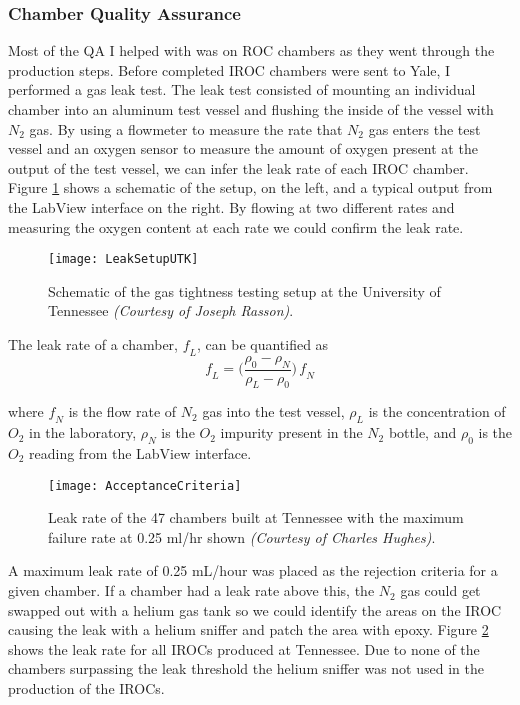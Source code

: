 \subsubsection{Chamber Quality Assurance}

Most of the QA I helped with was on ROC chambers as they went through the production steps.  Before completed IROC chambers were sent to Yale, I performed a gas leak test.  The leak test consisted of mounting an individual chamber into an aluminum test vessel and flushing the inside of the vessel with $N_{2}$ gas.  By using a flowmeter to measure the rate that $N_{2}$ gas enters the test vessel and an oxygen sensor to measure the amount of oxygen present at the output of the test vessel, we can infer the leak rate of each IROC chamber.  Figure \ref{fig:LeakTest} shows a schematic of the setup, on the left, and a typical output from the LabView interface on the right.  By flowing at two different rates and measuring the oxygen content at each rate we could confirm the leak rate.

\begin{figure}[h]
\texttt{[image: LeakSetupUTK]}
\centering
\caption{Schematic of the gas tightness testing setup at the University of Tennessee \textit{(Courtesy of Joseph Rasson)}. }
\label{fig:LeakTest}
\end{figure}


The leak rate of a chamber, $\mathit{f_{L}}$,  can be quantified as
\begin{equation}
\mathit{f_{L}} =\Bigg(  \frac{\rho_{0} -\rho_{N}}{\rho_{L} -\rho_{0}} \Bigg) \,  \mathit{f_{N}}
\label{eq:leakrate}
\end{equation}

\noindent
where $\mathit{f_{N}}$ is the flow rate of $N_{2}$ gas into the test vessel, $\rho_{L}$ is the concentration of $O_{2}$ in the laboratory, $\rho_{N}$ is the $O_{2}$ impurity present in the $N_{2}$ bottle, and $\rho_{0}$ is the $O_{2}$ reading from the LabView interface.  

\begin{figure}[h]
\texttt{[image: AcceptanceCriteria]}
\centering
\caption{Leak rate of the 47 chambers built at Tennessee with the maximum failure rate at 0.25 ml/hr shown \textit{(Courtesy of Charles Hughes)}. }
\label{fig:IROCLeaK}
\end{figure}

\noindent
A maximum leak rate of 0.25 mL/hour was placed as the rejection criteria for a given chamber.  If a chamber had a leak rate above this, the $N_{2}$ gas could get swapped out with a helium gas tank so we could identify the areas on the IROC causing the leak with a helium sniffer and patch the area with epoxy.  Figure \ref{fig:IROCLeaK} shows the leak rate for all IROCs produced at Tennessee.  Due to none of the chambers surpassing the leak threshold the helium sniffer was not used in the production of the IROCs. 

